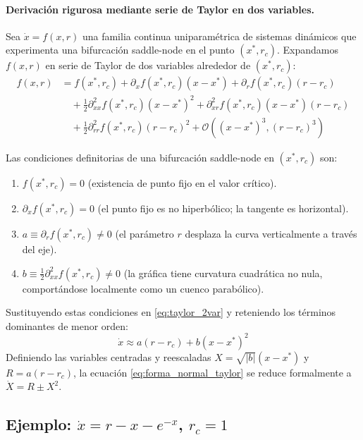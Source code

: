 \paragraph{Derivación rigurosa mediante serie de Taylor en dos variables.}
Sea $\dot{x} = f(x, r)$ una familia continua uniparamétrica de sistemas dinámicos que experimenta una bifurcación saddle-node en el punto $(x^*, r_c)$. Expandamos $f(x, r)$ en serie de Taylor de dos variables alrededor de $(x^*, r_c)$:
\begin{align}
    f(x, r) &= f(x^*, r_c) + \partial_x f(x^*, r_c)(x - x^*) + \partial_r f(x^*, r_c)(r - r_c) \nonumber \\
    &\quad + \frac{1}{2} \partial_{xx}^2 f(x^*, r_c)(x - x^*)^2 + \partial_{xr}^2 f(x^*, r_c)(x - x^*)(r - r_c) \nonumber \\
    &\quad + \frac{1}{2} \partial_{rr}^2 f(x^*, r_c)(r - r_c)^2 + \mathcal{O}\left((x - x^*)^3, (r - r_c)^3\right)
    \label{eq:taylor_2var}
\end{align}

Las condiciones definitorias de una bifurcación saddle-node en $(x^*, r_c)$ son:
\begin{enumerate}
    \item $f(x^*, r_c) = 0$ (existencia de punto fijo en el valor crítico).
    \item $\partial_x f(x^*, r_c) = 0$ (el punto fijo es no hiperbólico; la tangente es horizontal).
    \item $a \equiv \partial_r f(x^*, r_c) \neq 0$ (el parámetro $r$ desplaza la curva verticalmente a través del eje).
    \item $b \equiv \frac{1}{2} \partial_{xx}^2 f(x^*, r_c) \neq 0$ (la gráfica tiene curvatura cuadrática no nula, comportándose localmente como un cuenco parabólico).
\end{enumerate}

Sustituyendo estas condiciones en \eqref{eq:taylor_2var} y reteniendo los términos dominantes de menor orden:
\begin{equation}
    \dot{x} \approx a(r - r_c) + b(x - x^*)^2
    \label{eq:forma_normal_taylor}
\end{equation}
Definiendo las variables centradas y reescaladas $X = \sqrt{|b|}(x - x^*)$ y $R = a(r - r_c)$, la ecuación \eqref{eq:forma_normal_taylor} se reduce formalmente a $\dot{X} = R \pm X^2$.

\subsection{Ejemplo: $\dot{x} = r - x - e^{-x}$, $r_{c} = 1$}

